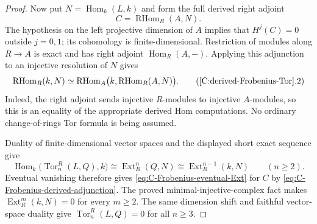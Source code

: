 \begin{proof}
Now put $N=\operatorname{Hom}_k(L,k)$ and form the full derived
right adjoint
\[
 C=\operatorname{RHom}_R(A,N).
\]
The hypothesis on the left projective dimension of $A$ implies
that $H^j(C)=0$ outside $j=0,1$; its cohomology is finite-dimensional.
Restriction of modules along $R\to A$ is exact and has right
adjoint $\operatorname{Hom}_R(A,-)$. Applying this adjunction
to an injective resolution of $N$ gives
\[
 \operatorname{RHom}_R(k,N)
 \simeq
 \operatorname{RHom}_A\bigl(k,\operatorname{RHom}_R(A,N)\bigr).
                                                               \tag{\ref{C:derived-Frobenius-Tor}.2}\label{eq:C-Frobenius-derived-adjunction}
\]
Indeed, the right adjoint sends injective $R$-modules to
injective $A$-modules, so this is an equality of the appropriate
derived Hom computations. No ordinary change-of-rings Tor
formula is being assumed.

Duality of finite-dimensional vector spaces and the displayed
short exact sequence give
\[
 \operatorname{Hom}_k\bigl(\operatorname{Tor}_n^R(L,Q),k\bigr)
 \cong\operatorname{Ext}_R^n(Q,N)
 \cong\operatorname{Ext}_R^{n-1}(k,N)\qquad(n\geq2).
\]
Eventual vanishing therefore gives
\eqref{eq:C-Frobenius-eventual-Ext} for $C$ by
\eqref{eq:C-Frobenius-derived-adjunction}.
The proved minimal-injective-complex fact makes
$\operatorname{Ext}_R^m(k,N)=0$ for every $m\geq2$.
The same dimension shift and faithful vector-space duality
give $\operatorname{Tor}_n^R(L,Q)=0$ for all $n\geq3$.
\end{proof}

